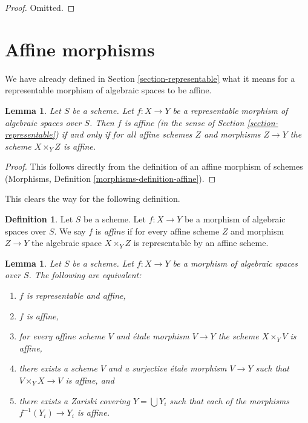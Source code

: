 \documentclass{stacks-project}
\theoremstyle{plain}
\newtheorem{lemma}[subsection]{Lemma}
\theoremstyle{definition}
\newtheorem{definition}[subsection]{Definition}
\theoremstyle{remark}
\numberwithin{equation}{subsection}
\begin{document}
\begin{proof}
Omitted.
\end{proof}











\section{Affine morphisms}
\label{section-affine}

\noindent
We have already defined in Section \ref{section-representable}
what it means for a representable morphism of algebraic spaces
to be affine.

\begin{lemma}
\label{lemma-affine-representable}
Let $S$ be a scheme. Let $f : X \to Y$ be a representable morphism
of algebraic spaces over $S$. Then
$f$ is affine (in the sense of Section \ref{section-representable})
if and only if for all affine schemes $Z$
and morphisms $Z \to Y$ the scheme $X \times_Y Z$ is affine.
\end{lemma}

\begin{proof}
This follows directly from the definition of an affine morphism of schemes
(Morphisms, Definition \ref{morphisms-definition-affine}).
\end{proof}

\noindent
This clears the way for the following definition.

\begin{definition}
\label{definition-affine}
Let $S$ be a scheme.
Let $f : X \to Y$ be a morphism of algebraic spaces over $S$.
We say $f$ is {\it affine} if for every affine scheme $Z$ and
morphism $Z \to Y$ the algebraic space $X \times_Y Z$ is representable
by an affine scheme.
\end{definition}

\begin{lemma}
\label{lemma-affine-local}
Let $S$ be a scheme.
Let $f : X \to Y$ be a morphism of algebraic spaces over $S$.
The following are equivalent:
\begin{enumerate}
\item $f$ is representable and affine,
\item $f$ is affine,
\item for every affine scheme $V$ and \'etale morphism $V \to Y$
the scheme $X \times_Y V$ is affine,
\item there exists a scheme $V$ and a surjective \'etale morphism
$V \to Y$ such that $V \times_Y X \to V$ is affine, and
\item there exists a Zariski covering $Y = \bigcup Y_i$ such
that each of the morphisms $f^{-1}(Y_i) \to Y_i$ is affine.
\end{enumerate}
\end{lemma}
\end{document}
